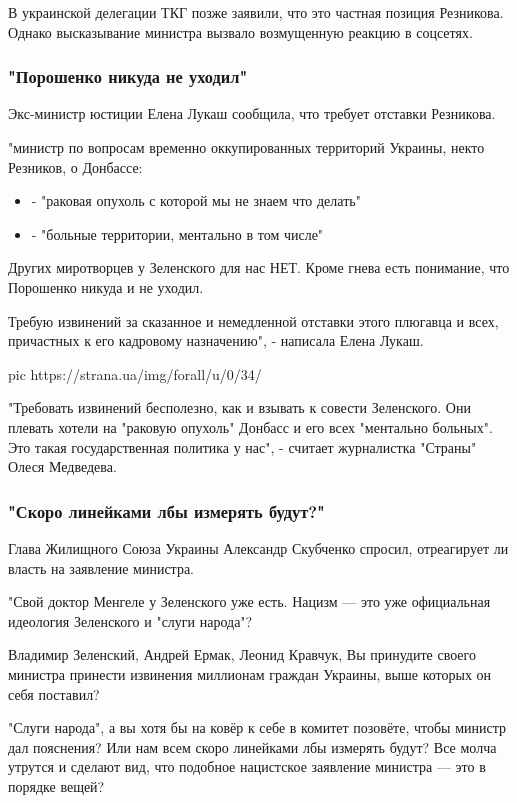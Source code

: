 В украинской делегации ТКГ позже заявили, что это частная позиция Резникова.
Однако высказывание министра вызвало возмущенную реакцию в соцсетях. 

\subsubsection{"Порошенко никуда не уходил"}

Экс-министр юстиции Елена Лукаш сообщила, что требует отставки Резникова.

"министр по вопросам временно оккупированных территорий Украины, некто
Резников, о Донбассе:

\begin{itemize}
	\item - "раковая опухоль с которой мы не знаем что делать" 
	\item - "больные территории, ментально в том числе"
\end{itemize}

Других миротворцев у Зеленского для нас НЕТ.  Кроме гнева есть понимание, что
Порошенко никуда и не уходил.

Требую извинений за сказанное и немедленной отставки этого плюгавца и всех,
причастных к его кадровому назначению", - написала Елена Лукаш.

\ifcmt
pic https://strana.ua/img/forall/u/0/34/%
\fi

"Требовать извинений бесполезно, как и взывать к совести Зеленского. Они
плевать хотели на "раковую опухоль" Донбасс и его всех "ментально больных". Это
такая государственная политика у нас", - считает журналистка "Страны" Олеся
Медведева.

\subsubsection{"Скоро линейками лбы измерять будут?"}

Глава Жилищного Союза Украины Александр Скубченко спросил, отреагирует ли
власть на заявление министра.

"Свой доктор Менгеле у Зеленского уже есть. Нацизм — это уже официальная
идеология Зеленского и "слуги народа"?

Владимир Зеленский, Андрей Ермак, Леонид Кравчук, Вы принудите своего министра
принести извинения миллионам граждан Украины, выше которых он себя поставил?

"Слуги народа", а вы хотя бы на ковёр к себе в комитет позовёте, чтобы министр
дал пояснения? Или нам всем скоро линейками лбы измерять будут? Все молча
утрутся и сделают вид, что подобное нацистское заявление министра — это в
порядке вещей?

